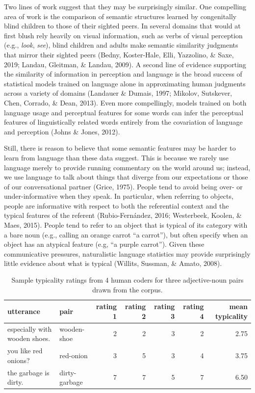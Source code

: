 \documentclass[10pt, letterpaper]{article}
\begin{document}
Two lines of work suggest that they may be surprisingly similar. One
compelling area of work is the comparison of semantic structures learned
by congenitally blind children to those of their sighted peers. In
several domains that would at first blush rely heavily on visual
information, such as verbs of visual perception (e.g., \emph{look},
\emph{see}), blind children and adults make semantic similarity
judgments that mirror their sighted peers (Bedny, Koster-Hale, Elli,
Yazzolino, \& Saxe, 2019; Landau, Gleitman, \& Landau, 2009). A second
line of evidence supporting the similarity of information in perception
and language is the broad success of statistical models trained on
language alone in approximating human judgments across a variety of
domains (Landauer \& Dumais, 1997; Mikolov, Sutskever, Chen, Corrado, \&
Dean, 2013). Even more compellingly, models trained on both language
usage and perceptual features for some words can infer the perceptual
features of linguistically related words entirely from the covariation
of language and perception (Johns \& Jones, 2012).

Still, there is reason to believe that some semantic features may be
harder to learn from language than these data suggest. This is because
we rarely use language merely to provide running commentary on the world
around us; instead, we use language to talk about things that diverge
from our expectations or those of our conversational partner (Grice,
1975). People tend to avoid being over- or under-informative when they
speak. In particular, when referring to objects, people are informative
with respect to both the referential context and the typical features of
the referent (Rubio-Fernández, 2016; Westerbeek, Koolen, \& Maes, 2015).
People tend to refer to an object that is typical of its category with a
bare noun (e.g., calling an orange carrot ``a carrot''), but often
specify when an object has an atypical feature (e.g, ``a purple
carrot''). Given these communicative pressures, naturalistic language
statistics may provide surprisingly little evidence about what is
typical (Willits, Sussman, \& Amato, 2008).

\begin{table}[tb]
\centering
\begin{tabular}{llrrrrr}
  \hline
utterance & pair & rating 1 & rating 2 & rating 3 & rating 4 & mean typicality \\ 
  \hline
especially with wooden shoes. & wooden-shoe &   2 &   2 &   3 &   2 & 2.75 \\ 
  you like red onions? & red-onion &   3 &   5 &   3 &   4 & 3.75 \\ 
  the garbage is dirty. & dirty-garbage &   7 &   7 &   5 &   7 & 6.50 \\ 
   \hline
\end{tabular}
\caption{Sample typicality ratings from 4 human coders for three adjective-noun pairs drawn from the corpus.} 
\label{tab:utt_table}
\end{table}
\end{document}
